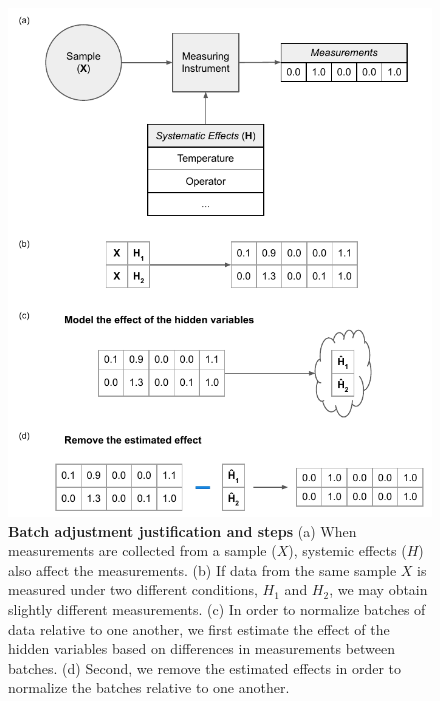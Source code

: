 \documentclass[notitlepage]{article}
\begin{document}
\begin{figure}
	\centering
	\includegraphics[width=\columnwidth]{figures/final/adjuster_workflow}
	\caption{\textbf{Batch adjustment justification and steps}
	(a) When measurements are collected from a sample ($X$), systemic effects ($H$) also affect the measurements.
	(b) If data from the same sample $X$ is measured under two different conditions, $H_1$ and $H_2$, we may obtain slightly different measurements.
	(c) In order to normalize batches of data relative to one another, we first estimate the effect of the hidden variables based on differences in measurements between batches.
	(d) Second, we remove the estimated effects in order to normalize the batches relative to one another.}
	\label{fig:workflow}
\end{figure}
\end{document}
